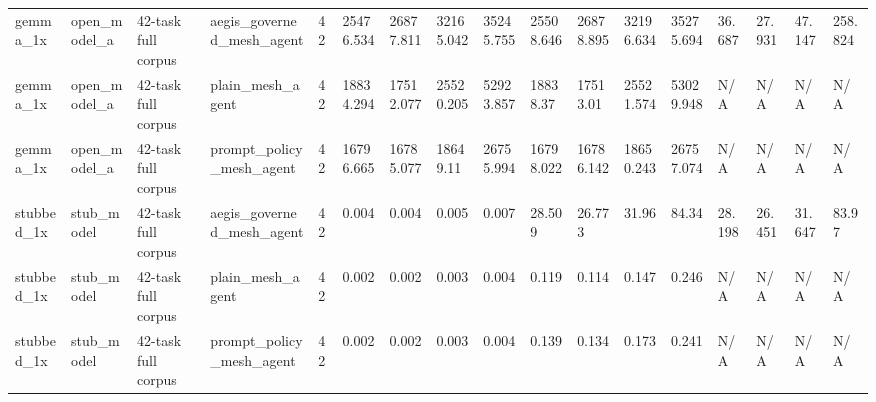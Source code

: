 \begin{tabular}{lllllllllllllllll}
gemma\_1x & open\_model\_a & 42-task full corpus & aegis\_governed\_mesh\_agent & 42 & 25476.534 & 26877.811 & 32165.042 & 35245.755 & 25508.646 & 26878.895 & 32196.634 & 35275.694 & 36.687 & 27.931 & 47.147 & 258.824 \\
gemma\_1x & open\_model\_a & 42-task full corpus & plain\_mesh\_agent & 42 & 18834.294 & 17512.077 & 25520.205 & 52923.857 & 18838.37 & 17513.01 & 25521.574 & 53029.948 & N/A & N/A & N/A & N/A \\
gemma\_1x & open\_model\_a & 42-task full corpus & prompt\_policy\_mesh\_agent & 42 & 16796.665 & 16785.077 & 18649.11 & 26755.994 & 16798.022 & 16786.142 & 18650.243 & 26757.074 & N/A & N/A & N/A & N/A \\
stubbed\_1x & stub\_model & 42-task full corpus & aegis\_governed\_mesh\_agent & 42 & 0.004 & 0.004 & 0.005 & 0.007 & 28.509 & 26.773 & 31.96 & 84.34 & 28.198 & 26.451 & 31.647 & 83.97 \\
stubbed\_1x & stub\_model & 42-task full corpus & plain\_mesh\_agent & 42 & 0.002 & 0.002 & 0.003 & 0.004 & 0.119 & 0.114 & 0.147 & 0.246 & N/A & N/A & N/A & N/A \\
stubbed\_1x & stub\_model & 42-task full corpus & prompt\_policy\_mesh\_agent & 42 & 0.002 & 0.002 & 0.003 & 0.004 & 0.139 & 0.134 & 0.173 & 0.241 & N/A & N/A & N/A & N/A \\
 \hline
\end{tabular}

